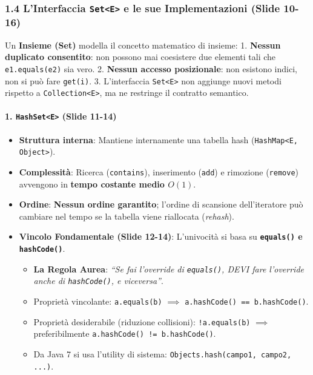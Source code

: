 \documentclass[11pt,a4paper]{article}
\newcommand{\passthrough}[1]{#1}
\providecommand{\tightlist}{\setlength{\itemsep}{0pt}\setlength{\parskip}{0pt}}
\begin{document}
\subsubsection{\texorpdfstring{1.4 L'Interfaccia
\texttt{Set\textless{}E\textgreater{}} e le sue Implementazioni (Slide
10-16)}{1.4 L'Interfaccia Set\textless E\textgreater{} e le sue Implementazioni (Slide 10-16)}}\label{linterfaccia-sete-e-le-sue-implementazioni-slide-10-16}

Un \textbf{Insieme (Set)} modella il concetto matematico di insieme: 1.
\textbf{Nessun duplicato consentito}: non possono mai coesistere due
elementi tali che \passthrough{\lstinline!e1.equals(e2)!} sia vero. 2.
\textbf{Nessun accesso posizionale}: non esistono indici, non si può
fare \passthrough{\lstinline!get(i)!}. 3. L'interfaccia
\passthrough{\lstinline!Set<E>!} non aggiunge nuovi metodi rispetto a
\passthrough{\lstinline!Collection<E>!}, ma ne restringe il contratto
semantico.

\paragraph{\texorpdfstring{1. \texttt{HashSet\textless{}E\textgreater{}}
(Slide
11-14)}{1. HashSet\textless E\textgreater{} (Slide 11-14)}}\label{hashsete-slide-11-14}

\begin{itemize}
\tightlist
\item
  \textbf{Struttura interna}: Mantiene internamente una tabella hash
  (\passthrough{\lstinline!HashMap<E, Object>!}).
\item
  \textbf{Complessità}: Ricerca (\passthrough{\lstinline!contains!}),
  inserimento (\passthrough{\lstinline!add!}) e rimozione
  (\passthrough{\lstinline!remove!}) avvengono in \textbf{tempo costante
  medio \(O(1)\)}.
\item
  \textbf{Ordine}: \textbf{Nessun ordine garantito}; l'ordine di
  scansione dell'iteratore può cambiare nel tempo se la tabella viene
  riallocata (\emph{rehash}).
\item
  \textbf{Vincolo Fondamentale (Slide 12-14)}: L'univocità si basa su
  \textbf{\passthrough{\lstinline!equals()!} e
  \passthrough{\lstinline!hashCode()!}}.

  \begin{itemize}
  \tightlist
  \item
    \textbf{La Regola Aurea}: \emph{``Se fai l'override di
    \passthrough{\lstinline!equals()!}, DEVI fare l'override anche di
    \passthrough{\lstinline!hashCode()!}, e viceversa''}.
  \item
    Proprietà vincolante: \passthrough{\lstinline!a.equals(b)!}
    \(\implies\) \passthrough{\lstinline!a.hashCode() == b.hashCode()!}.
  \item
    Proprietà desiderabile (riduzione collisioni):
    \passthrough{\lstinline"!a.equals(b)"} \(\implies\) preferibilmente
    \passthrough{\lstinline"a.hashCode() != b.hashCode()"}.
  \item
    Da Java 7 si usa l'utility di sistema:
    \passthrough{\lstinline!Objects.hash(campo1, campo2, ...)!}.
  \end{itemize}
\end{itemize}
\end{document}
